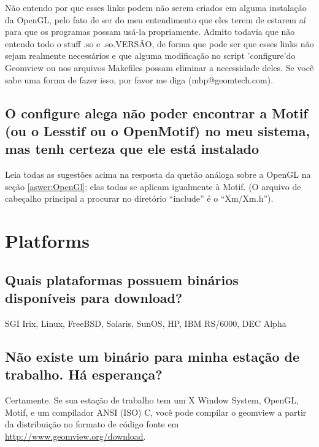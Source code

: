 \documentclass[12pt,a4paper]{article}
\begin{document}
\begin{itemize}
            N\~ao entendo por que esses links podem n\~ao serem criados em alguma
            instala\c{c}\~ao da OpenGL, pelo fato de ser do meu entendimento que eles
            terem de estarem a\'i para que os programas possam us\'a-la propriamente. Admito todavia que
            n\~ao entendo todo o stuff .so e .so.VERS\~AO, de forma que pode ser
            que esses links n\~ao sejam realmente necess\'arios e que alguma modifica\c{c}\~ao no
            script 'configure'do Geomview ou nos arquivos Makefiles possam eliminar a necessidade
            deles. Se voc\^e sabe uma forma de fazer isso, por favor me diga
            (mbp@geomtech.com).
     \end{itemize}

    \subsection{O configure alega n\~ao poder encontrar a Motif (ou o Lesstif ou o OpenMotif) no meu sistema, mas tenh certeza que ele est\'a instalado}

        Leia todas as sugest\~oes acima na resposta da quet\~ao an\'aloga
        sobre a OpenGL na se\c{c}\~ao \ref{aswer:OpenGl}; elas todas se aplicam igualmente \`a
        Motif. (O arquivo de cabe\c{c}alho principal a procurar no diret\'{o}rio ``include'' \'e o
        ``Xm/Xm.h'').

\section{Platforms}

    \subsection{Quais plataformas possuem bin\'arios dispon\'iveis \newline para download?}

        SGI Irix, Linux, FreeBSD, Solaris, SunOS, HP, IBM RS/6000, DEC Alpha

    \subsection{N\~ao existe um bin\'ario para minha esta\c{c}\~ao de trabalho. H\'a esperan\c{c}a?}

        Certamente. Se sua esta\c{c}\~ao de trabalho tem um X Window System, OpenGL, Motif,
        e um compilador ANSI (ISO) C, voc\^e pode compilar o geomview a partir da distribui\c{c}\~ao no
        formato de c\'{o}digo fonte em 
        \url{http://www.geomview.org/download}.
\end{document}
